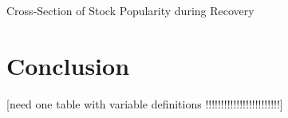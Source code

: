 \documentclass[12pt]{article}
\numberwithin{equation}{section} %
\begin{document}
\begin{table}[H]
\caption{Cross-Section of Stock Popularity during Recovery}
 \label{recoveryreg}
\end{table}


\section{Conclusion} \label{conclusion}


\newpage
\nocite{*}
 

 
 
 \newpage


 
 [need one table with variable definitions !!!!!!!!!!!!!!!!!!!!!!!!]
 
\end{document}
